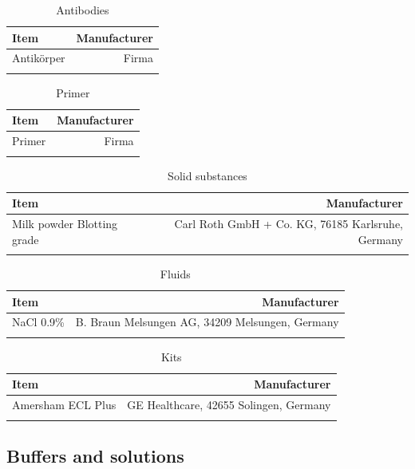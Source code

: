 \documentclass[
	    a4paper, 				%
	    bibliography=totocnumbered,		%
	    listof=totocnumbered,		%
	    11pt, 				%
]{scrreprt}
\begin{document}
				\begin{longtable}{||l|r||}
						Item&Manufacturer\\
					\hline\hline
						\multirow{2}{0.62\textwidth}{Antikörper}&
						\multirow{2}{0.30\textwidth}{Firma}\\&\\	
					\hline\hline
					\caption{Antibodies}
				\end{longtable}
				\begin{longtable}{||l|r||}
							Item&Manufacturer\\
						\hline\hline
							\multirow{2}{0.62\textwidth}{Primer}&
							\multirow{2}{0.30\textwidth}{Firma}\\&\\			
						\hline\hline	
						\caption{Primer}
					\end{longtable}
					\begin{longtable}{||l|r||}
							Item&Manufacturer\\
						\hline\hline
							\multirow{2}{0.62\textwidth}{Milk powder Blotting grade}&
							\multirow{2}{0.30\textwidth}{Carl Roth GmbH + Co. KG, 76185 Karlsruhe, Germany}\\&\\
						\hline\hline
						\caption{Solid substances}
					\end{longtable}
					\begin{longtable}{||l|r||}
							Item&Manufacturer\\
						\hline\hline
							\multirow{3}{0.62\textwidth}{NaCl 0.9\%}&
							\multirow{3}{0.30\textwidth}{B. Braun Melsungen AG, 34209 Melsungen, Germany}\\&\\&\\
						\hline\hline
						\caption{Fluids}
					\end{longtable}
					\begin{longtable}{||l|r||}
							Item&Manufacturer\\
						\hline\hline
							\multirow{2}{0.62\textwidth}{Amersham ECL Plus}&
							\multirow{2}{0.30\textwidth}{GE Healthcare, 42655 Solingen, Germany}\\&\\
						\hline\hline
					\caption{Kits}
				\end{longtable}

			\subsection{Buffers and solutions}
\end{document}
